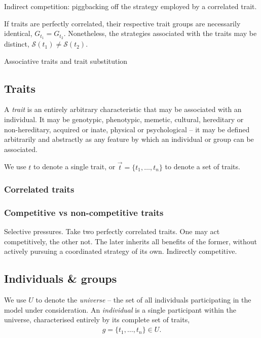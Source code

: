\documentclass[aps,rmp,twocolumn,amsmath,amssymb,nofootinbib,superscriptaddress]{revtex4}
\begin{document}
Indirect competition: piggbacking off the strategy employed by a correlated trait.

If traits are perfectly correlated, their respective trait groups are necessarily identical, $G_{t_1}=G_{t_2}$. Nonetheless, the strategies associated with the traits may be distinct, $\mathcal{S}(t_1)\neq\mathcal{S}(t_2)$.

Associative traits and trait substitution

\subsection{Traits}

A \textit{trait} is an entirely arbitrary characteristic that may be associated with an individual. It may be genotypic, phenotypic, memetic, cultural, hereditary or non-hereditary, acquired or inate, physical or psychological -- it may be defined arbitrarily and abstractly as any feature by which an individual or group can be associated.

We use $t$ to denote a single trait, or $\vec t=\{t_1,\dots,t_n\}$ to denote a set of traits.

\subsubsection{Correlated traits}

\subsubsection{Competitive vs non-competitive traits}

Selective pressures. Take two perfectly correlated traits. One may act competitively, the other not. The later inherits all benefits of the former, without actively pursuing a coordinated strategy of its own. Indirectly competitive.

\subsection{Individuals \& groups}

We use $U$ to denote the \textit{universe} -- the set of all individuals participating in the model under consideration. An \textit{individual} is a single participant within the universe, characterised entirely by its complete set of traits,
\begin{align}
	g=\{t_1,\dots,t_n\} \in U.
\end{align}
\end{document}
